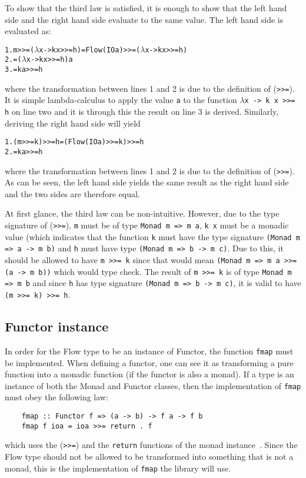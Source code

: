To show that the third law is satisfied, it is enough to show that the left hand side and the right hand side evaluate to the same value. The left hand side is evaluated as:
\begin{alltt}
  1. m >>= (\(\lambda\)x -> k x >>= h) = Flow (IO a) >>= (\(\lambda\)x -> k x >>= h)
  2.                         = (\(\lambda\)x -> k x >>= h) a
  3.                         = k a >>= h
\end{alltt}
where the transformation between lines 1 and 2 is due to the definition of ({\tt >>=}). It is simple lambda-calculus to apply the value {\tt a} to the function {\tt \(\lambda\)x -> k x >>= h} on line two and it is through this the result on line 3 is derived.
\newline
\newline
Similarly, deriving the right hand side will yield
\begin{alltt}
  1. (m >>= k) >>= h = (Flow (IO a) >>= k) >>= h
  2.                 = k a >>= h
\end{alltt}
where the transformation between lines 1 and 2 is due to the definition of ({\tt >>=}). As can be seen, the left hand side yields the same result as the right hand side and the two sides are therefore equal.

At first glance, the third law can be non-intuitive. However, due to the type signature of ({\tt >>=}), {\tt m} must be of type {\tt Monad m => m a}, {\tt k x} must be a monadic value (which indicates that the function {\tt k} must have the type signature {\tt (Monad m => a -> m b)} and {\tt h} must have type {\tt (Monad m => b -> m c)}. Due to this, it should be allowed to have {\tt m >>= k} since that would mean {\tt (Monad m => m a >>= (a -> m b))} which would type check. The result of {\tt m >>= k} is of type {\tt Monad m => m b} and since {\tt h} has type signature {\tt (Monad m => b -> m c)}, it is valid to have {\tt (m >>= k) >>= h}.
\subsection{Functor instance}
In order for the Flow type to be an instance of Functor, the function {\tt fmap} must be implemented. When defining a functor, one can see it as transforming a pure function into a monadic function (if the functor is also a monad). If a type is an instance of both the Monad and Functor classes, then the implementation of {\tt fmap} must obey the following law:
\begin{verbatim}
    fmap :: Functor f => (a -> b) -> f a -> f b
    fmap f ioa = ioa >>= return . f
\end{verbatim}
which uses the ({\tt >>=}) and the {\tt return} functions of the monad instance~\cite{functor-monad-law}. Since the Flow type should not be allowed to be transformed into something that is not a monad, this is the implementation of {\tt fmap} the library will use.
